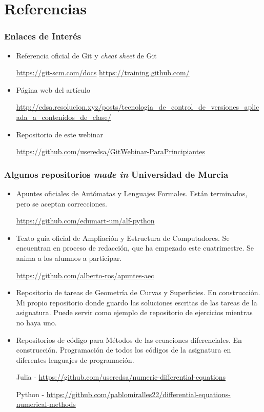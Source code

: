 \section{Referencias}

\begin{frame}\frametitle{Enlaces de Interés}
\begin{itemize}
    \item Referencia oficial de Git y \textit{cheat sheet} de Git

    \url{https://git-scm.com/docs}
    \url{https://training.github.com/}

    \item Página web del artículo

    \url{http://edsa.resolucion.xyz/posts/tecnologia_de_control_de_versiones_aplicada_a_contenidos_de_clase/}

    \item Repositorio de este webinar

    \url{https://github.com/useredsa/GitWebinar-ParaPrincipiantes}
\end{itemize}
\end{frame}

\begin{frame}\frametitle{Algunos repositorios \textit{made in} Universidad de Murcia}
\small
\begin{itemize}
    \footnotesize
    \item Apuntes oficiales de Autómatas y Lenguajes Formales.
    Están terminados, pero se aceptan correcciones.

    \url{https://github.com/edumart-um/alf-python}

    \item Texto guía oficial de Ampliación y Estructura de Computadores.
    Se encuentran en proceso de redacción,
    que ha empezado este cuatrimestre.
    Se anima a los alumnos a participar.

    \url{https://github.com/alberto-ros/apuntes-aec}

    \item Repositorio de tareas de Geometría de Curvas y Superficies.
    En construcción.
    Mi propio repositorio donde guardo las soluciones escritas
    de las tareas de la asignatura.
    Puede servir como ejemplo de repositorio de ejercicios mientras no haya uno.

    \item Repositorios de código para Métodos de las ecuaciones diferenciales.
    En construcción.
    Programación de todos los códigos de la asignatura en
    diferentes lenguajes de programación.

    Julia - \url{https://github.com/useredsa/numeric-differential-equations}

    Python - \url{https://github.com/pablomiralles22/differential-equations-numerical-methods}
\end{itemize}
\end{frame}

